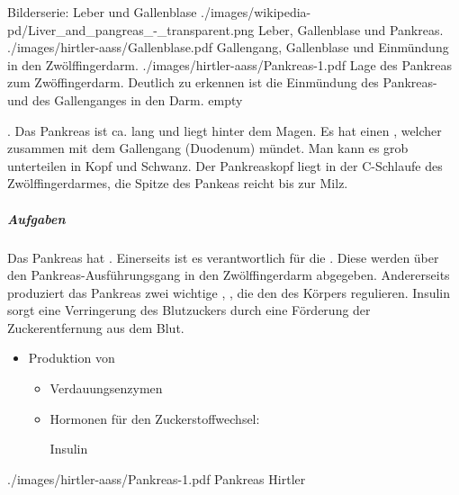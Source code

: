  


\begin{PictureSeriesWide}{}{Bilderserie: Leber und
Gallenblase}
{./images/wikipedia-pd/Liver_and_pangreas_-_transparent.png}
{Leber, Gallenblase und
Pankreas.
}
{./images/hirtler-aass/Gallenblase.pdf}
{Gallengang, Gallenblase und Einmündung in den
Zwölffingerdarm.
}
{./images/hirtler-aass/Pankreas-1.pdf}
{Lage des Pankreas zum Zwöffingerdarm. Deutlich zu erkennen
ist die Einmündung des Pankreas- und des Gallenganges in
den Darm. }
{empty}
{}
\end{PictureSeriesWide}




{%
%
%
 . Das Pankreas ist ca. \CM* lang und liegt
hinter dem Magen. Es hat einen , welcher
zusammen mit dem Gallengang 
(Duodenum) mündet. Man kann es grob unterteilen in Kopf und
Schwanz. Der Pankreaskopf liegt in der C-Schlaufe des
Zwölffingerdarmes, die Spitze des Pankeas reicht bis zur
Milz.

\subparagraph{Aufgaben} 
Das Pankreas hat .
Einerseits ist es verantwortlich für die . Diese werden über den
Pankreas-Ausführungsgang in den Zwölffingerdarm abgegeben.
Andererseits produziert das Pankreas zwei wichtige ,
 , die  den
 des Körpers regulieren. Insulin sorgt eine
Verringerung des Blutzuckers durch eine Förderung der
Zuckerentfernung aus dem Blut. 
}
{
\begin{itemize}
  \item Produktion von
  \begin{itemize}
    \item Verdauungsenzymen
    \item Hormonen für den Zuckerstoffwechsel:
    
    Insulin 
  \end{itemize}
\end{itemize}
}
{./images/hirtler-aass/Pankreas-1.pdf}
{Pankreas}
{Hirtler}




